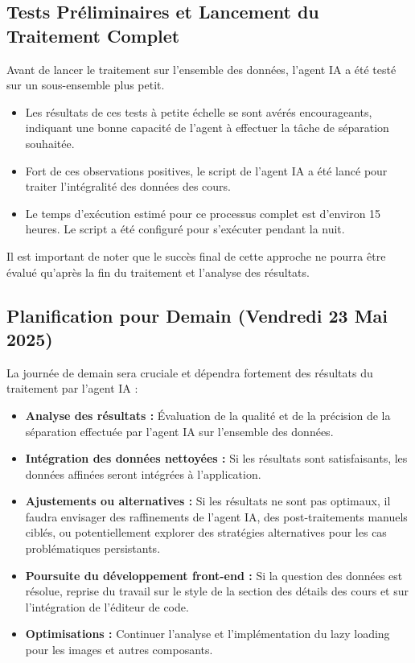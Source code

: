 \documentclass[12pt, a4paper]{article}
\begin{document}
\subsection{Tests Préliminaires et Lancement du Traitement Complet}
Avant de lancer le traitement sur l'ensemble des données, l'agent IA a été testé sur un sous-ensemble plus petit.
\begin{itemize}
    \item Les résultats de ces tests à petite échelle se sont avérés encourageants, indiquant une bonne capacité de l'agent à effectuer la tâche de séparation souhaitée.
    \item Fort de ces observations positives, le script de l'agent IA a été lancé pour traiter l'intégralité des données des cours.
    \item Le temps d'exécution estimé pour ce processus complet est d'environ 15 heures. Le script a été configuré pour s'exécuter pendant la nuit.
\end{itemize}
Il est important de noter que le succès final de cette approche ne pourra être évalué qu'après la fin du traitement et l'analyse des résultats.

\subsection{Planification pour Demain (Vendredi 23 Mai 2025)} %
La journée de demain sera cruciale et dépendra fortement des résultats du traitement par l'agent IA :
\begin{itemize}
  \item \textbf{Analyse des résultats :} Évaluation de la qualité et de la précision de la séparation effectuée par l'agent IA sur l'ensemble des données.
  \item \textbf{Intégration des données nettoyées :} Si les résultats sont satisfaisants, les données affinées seront intégrées à l'application.
  \item \textbf{Ajustements ou alternatives :} Si les résultats ne sont pas optimaux, il faudra envisager des raffinements de l'agent IA, des post-traitements manuels ciblés, ou potentiellement explorer des stratégies alternatives pour les cas problématiques persistants.
  \item \textbf{Poursuite du développement front-end :} Si la question des données est résolue, reprise du travail sur le style de la section des détails des cours et sur l'intégration de l'éditeur de code.
  \item \textbf{Optimisations :} Continuer l'analyse et l'implémentation du lazy loading pour les images et autres composants.
\end{itemize}
\end{document}
